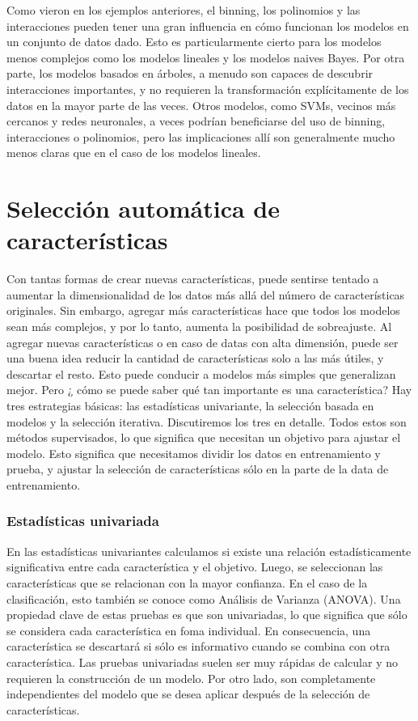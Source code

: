 Como vieron en los ejemplos anteriores, el binning, los polinomios y las interacciones pueden tener una gran influencia en cómo funcionan los modelos en un conjunto de datos dado. 
 Esto es particularmente cierto para los modelos menos complejos como los modelos lineales y los modelos   naives Bayes. Por otra parte, los modelos basados en árboles,  a menudo son capaces de descubrir interacciones importantes, y no requieren la transformación explícitamente de los datos en la mayor parte de las veces.   Otros modelos, como   SVMs,  vecinos más cercanos  y  redes neuronales, a veces podrían beneficiarse del uso de binning, interacciones o polinomios, pero las implicaciones allí son generalmente mucho menos claras que en el caso de los modelos lineales.


\section{Selección automática de características}

Con tantas formas de crear nuevas características, puede sentirse tentado a aumentar la dimensionalidad de los datos más allá del número de características originales.  Sin embargo, agregar más características  hace que todos los modelos sean más complejos,  y  por lo tanto, aumenta la posibilidad de sobreajuste. Al agregar nuevas características o en caso de datas con alta dimensión,   puede ser una buena idea reducir la cantidad de características  solo a las más útiles, y descartar el resto. Esto puede conducir a modelos más simples que generalizan mejor. Pero  ¿ cómo se puede saber qué tan importante es una  característica?   Hay tres estrategias básicas: las estadísticas  univariante, la selección basada en modelos y la selección iterativa. Discutiremos los tres en detalle. Todos estos son métodos  supervisados, lo que significa que necesitan un objetivo para ajustar el modelo. Esto significa que necesitamos dividir los datos en entrenamiento y prueba, y   ajustar  la selección de características sólo en la parte de la  data de  entrenamiento.

\subsubsection{Estadísticas univariada}

En las estadísticas univariantes  calculamos si existe una relación estadísticamente significativa  entre cada característica y el objetivo. Luego, se seleccionan las características que se relacionan con la mayor confianza. En el caso de la clasificación,  esto también se conoce como
Análisis de Varianza (ANOVA). Una propiedad clave de estas pruebas es que son univariadas, lo que significa que sólo se considera cada característica en foma individual.  En consecuencia, una característica se descartará si sólo es informativo cuando se combina con otra característica.  Las pruebas univariadas suelen ser muy rápidas de calcular y no requieren la construcción de un modelo. Por otro lado, son completamente independientes del modelo que se desea aplicar después de la selección de características.\\

